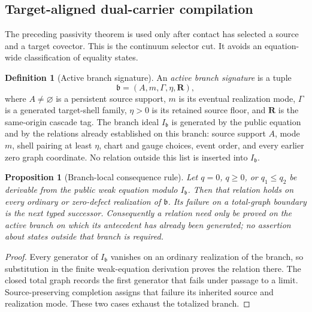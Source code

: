 \documentclass[11pt]{article}
\numberwithin{section}{part}
\theoremstyle{plain}
\newtheorem{proposition}[proposition]{Proposition}
\theoremstyle{definition}
\newtheorem{definition}[definition]{Definition}
\theoremstyle{remark}
\begin{document}
\subsection{Target-aligned dual-carrier compilation}
\label{subsec:target-aligned-dual-carrier}

The preceding passivity theorem is used only after contact has selected a
source and a target covector.  This is the continuum selector cut.  It avoids
an equation-wide classification of equality states.

\begin{definition}[Active branch signature]
\label{def:active-branch-signature}
An \emph{active branch signature} is a tuple
\begin{equation}
 \label{eq:active-branch-signature}
 \mathfrak b=(A,m,\Gamma,\eta,\mathbf R),
\end{equation}
where \(A\ne\varnothing\) is a persistent source support, \(m\) is its
eventual realization mode, \(\Gamma\) is a generated target-shell family,
\(\eta>0\) is its retained source floor, and \(\mathbf R\) is the same-origin
cascade tag.  The branch ideal \(I_{\mathfrak b}\) is generated by the public
equation and by the relations already established on this branch:
source support \(A\), mode \(m\), shell pairing at least \(\eta\), chart and
gauge choices, event order, and every earlier zero graph coordinate.
No relation outside this list is inserted into \(I_{\mathfrak b}\).
\end{definition}

\begin{proposition}[Branch-local consequence rule]
\label{prop:branch-local-consequence-rule}
Let \(q=0\), \(q\ge0\), or \(q_1\le q_2\) be derivable from the public weak
equation modulo \(I_{\mathfrak b}\).  Then that relation holds on every
ordinary or zero-defect realization of \(\mathfrak b\).  Its failure on a
total-graph boundary is the next typed successor.  Consequently a relation
need only be proved on the active branch on which its antecedent has already
been generated; no assertion about states outside that branch is required.
\end{proposition}

\begin{proof}
Every generator of \(I_{\mathfrak b}\) vanishes on an ordinary realization
of the branch, so substitution in the finite weak-equation derivation proves
the relation there.  The closed total graph records the first generator that
fails under passage to a limit.  Source-preserving completion assigns that
failure its inherited source and realization mode.  These two cases exhaust
the totalized branch.
\end{proof}
\end{document}
